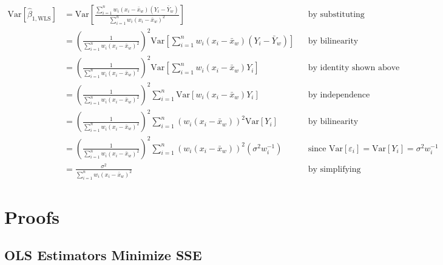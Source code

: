 \documentclass[12pt,oneside]{article}
\newcommand{\Var}{\text{Var}}
\newcommand{\WLS}{\text{WLS}}
\theoremstyle{definition}
\theoremstyle{remark}
\begin{document}
\begin{solutionbox}
{\[
\begin{aligned}
\Var[\hat{\beta}_{1, \WLS}] &= \Var \left[ \frac{\sum_{i = 1}^{n} w_i (x_i - \bar{x}_w) (Y_i - \bar{Y}_w)}{\sum_{i = 1}^{n} w_i (x_i - \bar{x}_w)^2} \right] && \text{by substituting} \\
&= \left( \frac{1}{\sum_{i = 1}^{n} w_i (x_i - \bar{x}_w)^2} \right)^2 \Var \left[ \sum_{i = 1}^{n} w_i (x_i - \bar{x}_w) (Y_i - \bar{Y}_w) \right] && \text{by bilinearity} \\
&= \left( \frac{1}{\sum_{i = 1}^{n} w_i (x_i - \bar{x}_w)^2} \right)^2 \Var \left[ \sum_{i = 1}^{n} w_i (x_i - \bar{x}_w) Y_i \right] && \text{by identity shown above} \\
&= \left( \frac{1}{\sum_{i = 1}^{n} w_i (x_i - \bar{x}_w)^2} \right)^2 \sum_{i = 1}^{n} \Var \left[ w_i (x_i - \bar{x}_w) Y_i \right] && \text{by independence} \\
&= \left( \frac{1}{\sum_{i = 1}^{n} w_i (x_i - \bar{x}_w)^2} \right)^2 \sum_{i = 1}^{n} (w_i (x_i - \bar{x}_w))^2 \Var[Y_i] && \text{by bilinearity} \\
&= \left( \frac{1}{\sum_{i = 1}^{n} w_i (x_i - \bar{x}_w)^2} \right)^2 \sum_{i = 1}^{n} (w_i (x_i - \bar{x}_w))^2 (\sigma^2 w_i^{-1}) && \text{since $\Var[\varepsilon_i] = \Var[Y_i] = \sigma^2 w_i^{-1}$} \\
&= \frac{\sigma^2}{\sum_{i = 1}^{n} w_i (x_i - \bar{x}_w)^2} && \text{by simplifying}
\end{aligned}
\]
}
\end{solutionbox}

\appendix
\section{Proofs}

\subsection{OLS Estimators Minimize SSE}
\label{app:ols-min}
\end{document}
